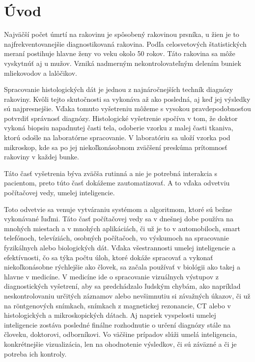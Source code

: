 \chapter{Úvod}


\hspace{10mm}Najväčší počet úmrtí na rakovinu je spôsobený rakovinou prsníka, u žien je to najfrekventovanejšie diagnostikovaná rakovina. Podľa celosvetových štatistických meraní postihuje hlavne ženy vo veku okolo 50 rokov. Táto rakovina sa môže vyskytnúť aj u mužov. Vzniká nadmerným nekontrolovateľným delením buniek mliekovodov a lalôčikov. 

\hspace{10mm}Spracovanie histologických dát je jednou z najnáročnejších techník diagnózy rakoviny. Kvôli tejto skutočnosti sa vykonáva až ako posledná, aj keď jej výsledky sú najpresnejšie. Vďaka tomuto vyšetreniu môžeme s vysokou pravdepodobnosťou potvrdiť správnosť diagnózy. Histologické vyšetrenie spočíva v tom, že doktor vykoná biopsiu napadnutej časti tela, odoberie vzorku z malej časti tkaniva, ktorú odošle na laboratórne spracovanie. V laboratóriu sa uloží vzorka pod mikroskop, kde sa po jej niekoľkonásobnom zväčšení  preskúma prítomnosť rakoviny v každej bunke. 

\hspace{10mm}Táto časť vyšetrenia býva zväčša rutinná a nie je potrebná interakcia s pacientom, preto túto časť dokážeme zautomatizovať. A to vďaka odvetviu počítačovej vedy, umelej inteligencie.

\hspace{10mm}Toto odvetvie sa venuje vytváraniu systémom a algoritmom, ktoré sú bežne vykonávané ľuďmi. Táto časť počítačovej vedy sa v dnešnej dobe používa na mnohých miestach a v mnohých aplikáciách, či už je to v automobiloch, smart telefónoch, televíziách, osobných počítačoch, vo výskumoch na spracovanie fyzikálnych alebo biologických dát. Vďaka všestrannosti umelej inteligencie a efektívnosti, čo sa týka počtu úloh, ktoré dokáže spracovať a vykonať niekoľkonásobne rýchlejšie ako človek, sa začala používať v biológii ako takej a hlavne v medicíne. V medicíne ide o spracovanie vizuálnych výstupov z diagnostických vyšetrení, aby sa predchádzalo ľudským chybám, ako napríklad neskontrolovaniu určitých záznamov alebo nevšimnutiu si závažných úkazov, či už na röntgenových snímkach, snímkach z magnetickej rezonancie, CT alebo v histologických a mikroskopických dátach. Aj napriek vyspelosti umelej inteligencie zostáva posledné finálne rozhodnutie o určení diagnózy stále na človeku, doktorovi, odborníkovi. Vo väčšine prípadov slúži umelá inteligencia, konkrétnejšie vizualizácia, len na ohodnotenie výsledkov, či sú záväzné a či je potreba ich kontroly.



